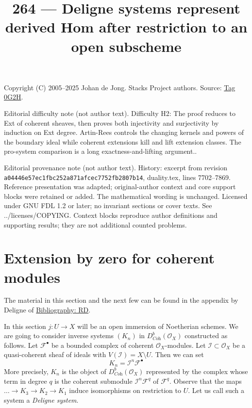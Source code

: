 \documentclass{amsart}
\theoremstyle{plain}
\theoremstyle{definition}
\theoremstyle{remark}
\numberwithin{equation}{subsection}
\begin{document}
\title[Stacks Project, Tag 0G2H]{264 --- Deligne systems represent derived Hom after restriction to an open subscheme}
\maketitle
\noindent Copyright (C) 2005--2025 Johan de Jong. Stacks Project authors. Source: \href{https://stacks.math.columbia.edu/tag/0G2H}{Tag 0G2H}.

\noindent Editorial difficulty note (not author text). Difficulty H2: The proof reduces to Ext of coherent sheaves, then proves both injectivity and surjectivity by induction on Ext degree. Artin-Rees controls the changing kernels and powers of the boundary ideal while coherent extensions kill and lift extension classes. The pro-system comparison is a long exactness-and-lifting argument..

\noindent Editorial provenance note (not author text). History: excerpt from revision \texttt{a0444\allowbreak 6e57e\allowbreak c1fbc\allowbreak 252a8\allowbreak 71afc\allowbreak ec775\allowbreak 2fb28\allowbreak 07b14}, duality.tex, lines 7702--7869. Reference presentation was adapted; original-author context and core support blocks were retained or added. The mathematical wording is unchanged. Licensed under GNU FDL 1.2 or later; no invariant sections or cover texts. See ../licenses/COPYING. Context blocks reproduce author definitions and supporting results; they are not additional counted problems.

\section{Extension by zero for coherent modules}
\label{section-extension-by-zero}

\noindent
The material in this section and the next few can be found
in the appendix by Deligne of \href{https://stacks.math.columbia.edu/bibliography}{Bibliography: RD}.

\medskip\noindent
In this section $j : U \to X$ will be an open immersion of Noetherian schemes.
We are going to consider inverse systems $(K_n)$ in
$D^b_{\textit{Coh}}(\mathcal{O}_X)$ constructed as follows.
Let $\mathcal{F}^\bullet$ be a bounded complex of coherent
$\mathcal{O}_X$-modules. Let $\mathcal{I} \subset \mathcal{O}_X$
be a quasi-coherent sheaf of ideals with $V(\mathcal{I}) = X \setminus U$.
Then we can set
$$
K_n = \mathcal{I}^n\mathcal{F}^\bullet
$$
More precisely, $K_n$ is the object of $D^b_{\textit{Coh}}(\mathcal{O}_X)$
represented by the complex whose term in degree $q$
is the coherent submodule $\mathcal{I}^n\mathcal{F}^q$ of $\mathcal{F}^q$.
Observe that the maps $\ldots \to K_3 \to K_2 \to K_1$ induce isomorphisms
on restriction to $U$. Let us call such a system a {\it Deligne system}.
\end{document}
